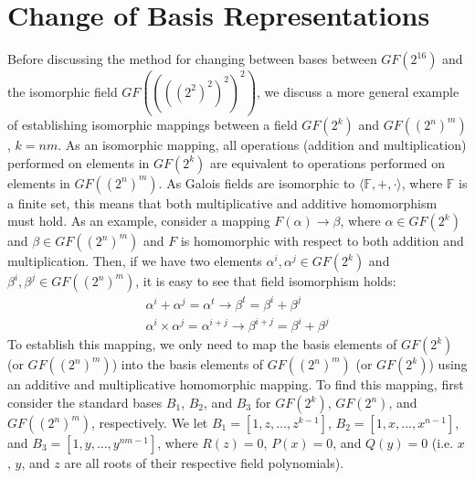 
\section{Change of Basis Representations}
Before discussing the method for changing between bases between $GF(2^{16})$ and the isomorphic field $GF((((2^2)^2)^2)^2)$, we discuss a more general example of establishing isomorphic mappings between a field $GF(2^k)$ and $GF((2^n)^m)$, $k = nm$. As an isomorphic mapping, all operations (addition and multiplication) performed on elements in $GF(2^k)$ are equivalent to operations performed on elements in $GF((2^n)^m)$. As Galois fields are isomorphic to $\langle \mathbb{F}, +, \cdot \rangle$, where $\mathbb{F}$ is a finite set, this means that both multiplicative and additive homomorphism must hold. As an example, consider a mapping $F(\alpha) \to \beta$, where $\alpha \in GF(2^k)$ and $\beta \in GF((2^n)^m)$ and $F$ is homomorphic with respect to both addition and multiplication. Then, if we have two elements $\alpha^i,\alpha^j \in GF(2^k)$ and $\beta^i,\beta^j \in GF((2^n)^m)$, it is easy to see that field isomorphism holds:
\begin{align*}
\alpha^i + \alpha^j = \alpha^t \to \beta^t = \beta^i + \beta^j \\
\alpha^i \times \alpha^j = \alpha^{i + j} \to \beta^{i + j} = \beta^i + \beta^j
\end{align*}
To establish this mapping, we only need to map the basis elements of $GF(2^k)$ (or $GF((2^n)^m)$) into the basis elements of $GF((2^n)^m)$ (or $GF(2^k)$) using an additive and multiplicative homomorphic mapping. To find this mapping, first consider the standard bases $B_1$, $B_2$, and $B_3$ for $GF(2^k)$, $GF(2^n)$, and $GF((2^n)^m)$, respectively. We let $B_1 = [1,z,\dots,z^{k-1}]$, $B_2 = [1,x,\dots,x^{n-1}]$, and $B_3 = [1,y,\dots,y^{nm-1}]$, where $R(z) = 0$, $P(x) = 0$, and $Q(y) = 0$ (i.e. $x$, $y$, and $z$ are all roots of their respective field polynomials). 

